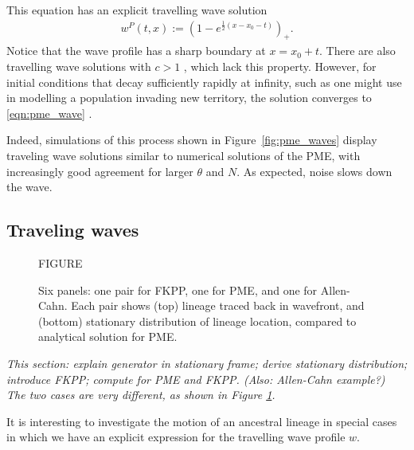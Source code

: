 \documentclass[12pt]{article}
\newcommand{\comment}[1]{{\color{blue} \it #1}}
\begin{document}
This equation has an explicit travelling wave solution
\begin{align} \label{eqn:pme_wave}
    w^P(t, x)
    :=
    \left( 1 - e^{ \frac{1}{2} (x - x_0 - t) } \right)_+ .
\end{align}
Notice that the wave profile has a sharp boundary at $x = x_0 + t$.
There are also travelling wave solutions with $c>1$ \citep{gilding/kersner:2005},
which lack this property.
However, for initial conditions that decay sufficiently rapidly at infinity,
such as one might use in modelling a population invading new territory,
the solution converges to \eqref{eqn:pme_wave} \citep{kamin/rosenau:2004}.

Indeed, simulations of this process
shown in Figure~\ref{fig:pme_waves}
display traveling wave solutions
similar to numerical solutions of the PME,
with increasingly good agreement for larger $\theta$ and $N$.
As expected, noise slows down the wave.


\subsection{Traveling waves}

\begin{figure}
    \begin{center}
        FIGURE
    \end{center}
    \caption{
        Six panels: one pair for FKPP, one for PME, and one for Allen-Cahn.
        Each pair shows (top) lineage traced back in wavefront,
        and (bottom) stationary distribution of lineage location,
        compared to analytical solution for PME.
        \label{fig:pme_vs_fkpp}
    }
\end{figure}

\comment{
    This section:
    explain generator in stationary frame;
    derive stationary distribution;
    introduce FKPP;
    compute for PME and FKPP.
    (Also: Allen-Cahn example?)
    The two cases are very different, as shown in Figure \ref{fig:pme_vs_fkpp}.
}

It is interesting to investigate the motion of an ancestral lineage
in special cases in which we have an explicit expression for the travelling
wave profile $w$. 

\end{document}
